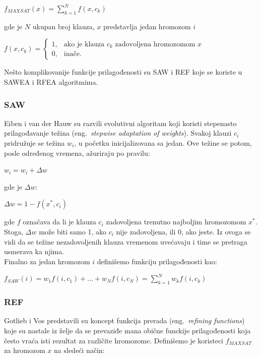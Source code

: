 \documentclass[a4paper]{article}
\begin{document}
	\begin{center}
	$ f_{MAXSAT} (x) = \sum_{k=1}^{N} f(x, c_k) $
	\end{center} 
	
gde je $N$ ukupan broj klauza, $x$ predstavlja jedan hromozom $i$

	\begin{center}
$ f(x, c_k) = \begin{cases} 1, & \mbox{ako je klauza } c_k \mbox{ zadovoljena hromozomom } x \\ 0, & \mbox{inače.} \end{cases} $
	\end{center}
Nešto komplikovanije funkcije prilagođenosti su SAW i REF koje se koriste
u SAWEA i RFEA algoritmima.


\subsubsection{SAW}
\label{sec:fitness_saw}
Eiben i van der Hauw su razvili evolutivni algoritam koji koristi stepenasto prilagođavanje
težina (eng.~{\em stepwise adaptation of weights}). Svakoj klauzi $c_i$ pridružuje se težina 
$w_i$, u početku inicijalizovana sa jedan. Ove težine se potom, posle određenog vremena,
ažuriraju po pravilu:  

	\begin{center}
	$ w_i = w_i + \Delta w $
	\end{center}
gde je $\Delta w$:
	\begin{center}
	$ \Delta w = 1 - f(x^*, c_i) $
	\end{center}
gde $f$ označava da li je klauza $c_i$ zadovoljena trenutno najboljim
hromozomom $x^*$. Stoga, $\Delta w$ može biti samo 1, ako $c_i$ nije zadovoljena, 
ili 0, ako jeste. Iz ovoga se vidi da se težine nezadovoljenih klauza vremenom uvećavaju
i time se pretraga usmerava ka njima. \\

Finalno za jedan hromozom $ i $ definišemo funkciju prilagođenosti kao:

	\begin{center}
	$ f_{SAW}(i) = w_1 f(i, c_1) + ... + w_N f(i, c_N) = \sum_{k=1}^{N} w_k f(i, c_k)	$
	\end{center}


\subsubsection{REF}
\label{sec:fitness_rfea}
Gotlieb i Vos \cite{GotVos98_f_ref} predstavili su koncept funkcija prerada 
(eng.~{\em refining functions}) koje su nastale iz želje da se prevaziđe mana obične 
funckije prilagođenosti koja često vraća isti rezultat za različite hromozome. 
Definišemo je koristeci $f_{MAXSAT}$ za hromozom $x$ na sledeći način:
\end{document}
